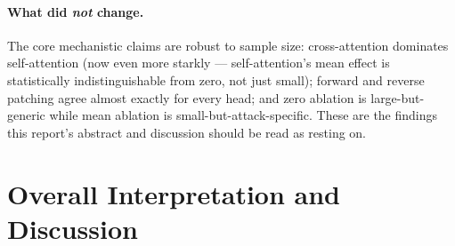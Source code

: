 \documentclass[11pt]{article}
\begin{document}
\paragraph{What did \emph{not} change.} The core mechanistic claims are
robust to sample size: cross-attention dominates self-attention (now even
more starkly — self-attention's mean effect is statistically
indistinguishable from zero, not just small); forward and reverse patching
agree almost exactly for every head; and zero ablation is large-but-generic
while mean ablation is small-but-attack-specific. These are the findings
this report's abstract and discussion should be read as resting on.

\section{Overall Interpretation and Discussion}
\end{document}
